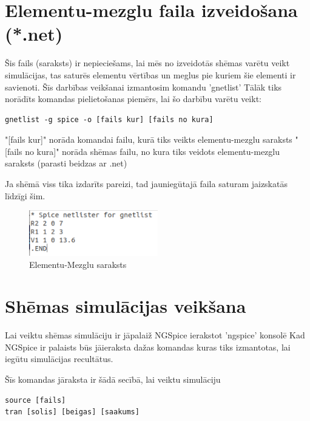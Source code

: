 \documentclass{article}
\begin{document}
\section{Elementu-mezglu faila izveidošana (*.net)}

Šis fails (saraksts) ir nepieciešams, lai mēs no izveidotās shēmas varētu veikt simulācijas, tas saturēs elementu vērtības un meglus pie kuriem šie elementi ir savienoti. Šīs darbības veikšanai izmantosim komandu {\large \textsf{'gnetlist'}} Tālāk tiks norādīts komandas pielietošanas piemērs, lai šo darbību varētu veikt:

\begin{lstlisting}
gnetlist -g spice -o [fails kur] [fails no kura] 
\end{lstlisting}

{\large \textsf{"[fails kur]"}} norāda komandai failu, kurā tiks veikts elementu-mezglu saraksts \newline
{\large \textsf{"[fails no kura]"}} norāda shēmas failu, no kura tiks veidots elementu-mezglu saraksts (parasti beidzas ar .net)

\vspace{5mm}
Ja shēmā viss tika izdarīts pareizi, tad jauniegūtajā faila saturam jaizskatās līdzīgi šim.
\vspace{2mm}
\begin{figure}[H]\centering\includegraphics[width=0.5\textwidth]{pictures/spice/ElementuMezgluSaraksts.PNG}\caption{Elementu-Mezglu saraksts}\label{picture:10lw12p}\end{figure}

\section{Shēmas simulācijas veikšana}

Lai veiktu shēmas simulāciju ir jāpalaiž NGSpice ierakstot {\large \textsf{'ngspice'}} konsolē Kad NGSpice ir palaists būs jāieraksta dažas komandas kuras tiks izmantotas, lai iegūtu simulācijas recultātus.

Šīs komandas jāraksta ir šādā secībā, lai veiktu simulāciju

\begin{lstlisting}
source [fails] 
tran [solis] [beigas] [saakums]
\end{lstlisting}
\end{document}
